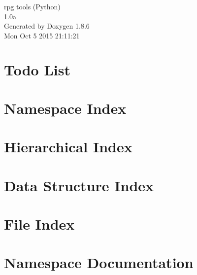 \documentclass[twoside]{book}
\newcommand{\clearemptydoublepage}{%
  \newpage{\pagestyle{empty}\cleardoublepage}%
}
\begin{document}
\hypersetup{pageanchor=false}
\begin{titlepage}
\vspace*{7cm}
\begin{center}%
{\Large rpg tools (Python) \\[1ex]\large 1.\-0a }\\
\vspace*{1cm}
{\large Generated by Doxygen 1.8.6}\\
\vspace*{0.5cm}
{\small Mon Oct 5 2015 21:11:21}\\
\end{center}
\end{titlepage}
\clearemptydoublepage
\tableofcontents
\clearemptydoublepage
{}
\hypersetup{pageanchor=true}

\chapter{Todo List}
\label{todo}
\hypertarget{todo}{}

\chapter{Namespace Index}

\chapter{Hierarchical Index}

\chapter{Data Structure Index}

\chapter{File Index}

\chapter{Namespace Documentation}


\end{document}

